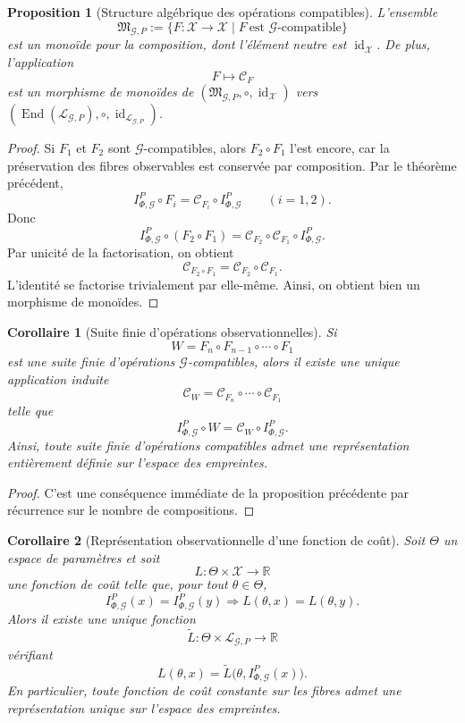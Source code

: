 \documentclass[11pt,a4paper]{article}
\newtheorem{proposition}{Proposition}
\newtheorem{corollary}{Corollaire}
\begin{document}
\begin{appendices}
\begin{proposition}[Structure algébrique des opérations compatibles]
\label{prop:monoid-operations}
L'ensemble
\[
\mathfrak M_{\mathcal G,P}:=\{F:\mathcal X\to\mathcal X\mid F\ \text{est \(\mathcal G\)-compatible}\}
\]
est un monoïde pour la composition, dont l'élément neutre est \(\operatorname{id}_{\mathcal X}\).
De plus, l'application
\[
F\longmapsto \mathcal C_F
\]
est un morphisme de monoïdes de \((\mathfrak M_{\mathcal G,P},\circ,\operatorname{id}_{\mathcal X})\) vers \((\operatorname{End}(\mathcal L_{\mathcal G,P}),\circ,\operatorname{id}_{\mathcal L_{\mathcal G,P}})\).
\end{proposition}

\begin{proof}
Si \(F_1\) et \(F_2\) sont \(\mathcal G\)-compatibles, alors \(F_2\circ F_1\) l'est encore, car la préservation des fibres observables est conservée par composition. Par le théorème précédent,
\[
I_{\Phi,\mathcal G}^P\circ F_i=\mathcal C_{F_i}\circ I_{\Phi,\mathcal G}^P
\qquad (i=1,2).
\]
Donc
\[
I_{\Phi,\mathcal G}^P\circ(F_2\circ F_1)
=
\mathcal C_{F_2}\circ\mathcal C_{F_1}\circ I_{\Phi,\mathcal G}^P.
\]
Par unicité de la factorisation, on obtient
\[
\mathcal C_{F_2\circ F_1}=\mathcal C_{F_2}\circ \mathcal C_{F_1}.
\]
L'identité se factorise trivialement par elle-même. Ainsi, on obtient bien un morphisme de monoïdes.
\end{proof}

\begin{corollary}[Suite finie d'opérations observationnelles]
Si
\[
W=F_n\circ F_{n-1}\circ\cdots\circ F_1
\]
est une suite finie d'opérations \(\mathcal G\)-compatibles, alors il existe une unique application induite
\[
\mathcal C_W=\mathcal C_{F_n}\circ\cdots\circ\mathcal C_{F_1}
\]
telle que
\[
I_{\Phi,\mathcal G}^P\circ W=\mathcal C_W\circ I_{\Phi,\mathcal G}^P.
\]
Ainsi, toute suite finie d'opérations compatibles admet une représentation entièrement définie sur l'espace des empreintes.
\end{corollary}

\begin{proof}
C'est une conséquence immédiate de la proposition précédente par récurrence sur le nombre de compositions.
\end{proof}

\begin{corollary}[Représentation observationnelle d'une fonction de coût]
Soit \(\Theta\) un espace de paramètres et soit
\[
L:\Theta\times\mathcal X\longrightarrow \mathbb R
\]
une fonction de coût telle que, pour tout \(\theta\in\Theta\),
\[
I_{\Phi,\mathcal G}^P(x)=I_{\Phi,\mathcal G}^P(y)
\Longrightarrow
L(\theta,x)=L(\theta,y).
\]
Alors il existe une unique fonction
\[
\widetilde L:\Theta\times\mathcal L_{\mathcal G,P}\longrightarrow \mathbb R
\]
vérifiant
\[
L(\theta,x)=\widetilde L\bigl(\theta,I_{\Phi,\mathcal G}^P(x)\bigr).
\]
En particulier, toute fonction de coût constante sur les fibres admet une représentation unique sur l'espace des empreintes.
\end{corollary}


\end{appendices}
\end{document}

